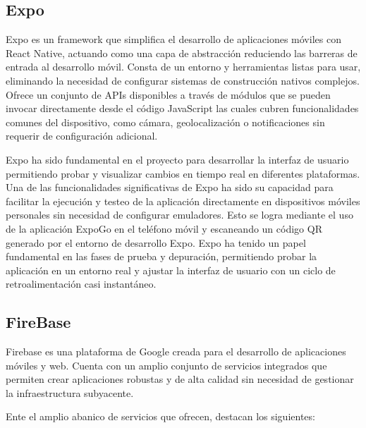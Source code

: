 \subsection{Expo}

Expo es un framework que simplifica el desarrollo de aplicaciones móviles con React Native, actuando como una capa de abstracción reduciendo las barreras de entrada al desarrollo móvil. 
Consta de un entorno y herramientas listas para usar, eliminando la necesidad de configurar sistemas de construcción nativos complejos. 
Ofrece un conjunto de APIs disponibles a través de módulos que se pueden invocar directamente desde el código JavaScript las cuales cubren funcionalidades comunes del dispositivo, como cámara, geolocalización o notificaciones sin requerir de configuración adicional. 

Expo ha sido fundamental en el proyecto para desarrollar la interfaz de usuario permitiendo probar y visualizar cambios en tiempo real en diferentes plataformas.
Una de las funcionalidades significativas de Expo ha sido su capacidad para facilitar la ejecución y testeo de la aplicación directamente en dispositivos móviles personales sin necesidad de configurar emuladores. Esto se logra mediante el uso de la aplicación ExpoGo en el teléfono móvil y escaneando un código QR generado por el entorno de desarrollo Expo.
Expo ha tenido un papel fundamental en las fases de prueba y depuración, permitiendo probar la aplicación en un entorno real y ajustar la interfaz de usuario con un ciclo de retroalimentación casi instantáneo.


\subsection{FireBase}

Firebase es una plataforma de Google creada para el desarrollo de aplicaciones móviles y web.
Cuenta con un amplio conjunto de servicios integrados que permiten crear aplicaciones robustas y de alta calidad sin necesidad de gestionar la infraestructura subyacente.

Ente el amplio abanico de servicios que ofrecen, destacan los siguientes:
 
